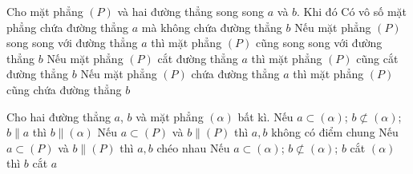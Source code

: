 \begin{ex}%
 Cho mặt phẳng $(P)$ và hai đường thẳng  song song $a$ và $b$. Khi đó
 \choiceTF 
   {\True Có vô số mặt phẳng chứa đường thẳng $a$ mà không chứa đường thẳng $b$}
  {Nếu mặt phẳng $(P)$ song song với đường thẳng $a$ thì mặt phẳng $(P)$ cũng song song với đường thẳng  $b$}
  {\True Nếu mặt phẳng $(P)$ cắt đường thẳng $a$  thì mặt phẳng $(P)$ cũng cắt đường thẳng $b$}
  {Nếu mặt phẳng  $(P)$ chứa đường thẳng $a$ thì mặt phẳng $(P)$ cũng chứa đường thẳng $b$}
\end{ex}

\begin{ex}%
 Cho hai đường  thẳng $a$, $b$ và mặt phẳng $(\alpha)$ bất kì.
 \choiceTF 
  {\True Nếu  $a \subset(\alpha)$; $b \not \subset (\alpha)$; $b \parallel a$ thì $b \parallel (\alpha)$}
  {\True Nếu $a \subset (P)$ và $b  \parallel(P)$ thì $a, b$ không có điểm chung}
  {Nếu $a \subset (P)$ và $b \parallel(P)$ thì $a, b$ chéo  nhau}
  {Nếu $a \subset(\alpha)$; $b \not  \subset (\alpha)$; $b$ cắt $(\alpha)$ thì $b$ cắt $a$}
\end{ex}

